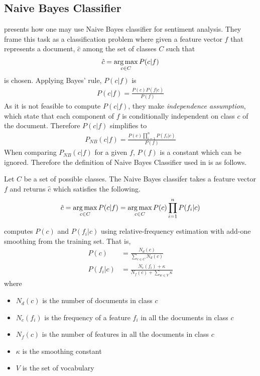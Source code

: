 \subsection{Naive Bayes Classifier}
\cite{pang2002thumbs} presents how one may use Naive Bayes classifier for sentiment analysis. They frame this task as a classification problem where given a feature vector $f$ that represents a document, $\hat{c}$ among the set of classes $C$ such that
\begin{align*}
\hat{c} = \operatorname*{arg\,max}_{c \in C}P(c|f)
\end{align*}
is chosen.
 Applying Bayes' rule, $P(c|f)$ is
\begin{align*}
P(c|f) = \frac{P(c)P(f|c)}{P(f)}
\end{align*}
As it is not feasible to compute $P(c|f)$, they make {\em independence assumption}, which state that each component of $f$ is conditionally independent on class $c$ of the document.
Therefore $P(c|f)$ simplifies to
\begin{align*}
P_{NB}(c|f) = \frac{P(c)\prod_{i=1}^{n}P(f_i|c)}{P(f)}
\end{align*}
When comparing $P_{NB}(c|f)$ for a given $f$, $P(f)$ is a constant which can be ignored. Therefore the definition of Naive Bayes Classifier used in \cite{pang2002thumbs} is as follows.
\begin{definition}
\label{def:2}
Let $C$ be a set of possible classes. The Naive Bayes classifer takes a feature vector $f$ and returns $\hat{c}$ which satisfies the following.
\begin{align*}
\hat{c} = \operatorname*{arg\,max}_{c \in C}P(c|f) = \operatorname*{arg\,max}_{c \in C}P(c)\prod_{i=1}^{n}P(f_i|c)
\end{align*}
\end{definition}
\cite{pang2002thumbs} computes $P(c)$ and $P(f_i|c)$ using relative-frequency estimation with add-one smoothing from the training set. That is,
\begin{align*}
P(c) &= \frac{N_d(c)}{\sum\limits_{c \in C}^{}N_d(c)}\\
P(f_i|c) &= \frac{N_c(f_i)+\kappa }{N_f(c) + \sum\limits_{w \in V} \kappa}
\end{align*}
where 
\begin{itemize}
\item $N_d(c)$ is the number of documents in class $c$
\item $N_c(f_i)$ is the frequency of a feature $f_i$ in all the documents in class $c$
\item $N_f(c)$ is the number of features in all the documents in class $c$
\item $\kappa$ is the smoothing constant
\item $V$ is the set of vocabulary
\end{itemize}
